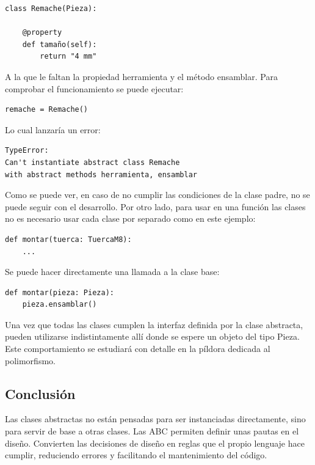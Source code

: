 \documentclass[11pt,a5paper,twoside]{book}
\begin{document}
\newpage


\begin{tcolorbox}
\scriptsize
 \begin{verbatim}
class Remache(Pieza):

    @property
    def tamaño(self):
        return "4 mm"
\end{verbatim}
\end{tcolorbox}
A la que le faltan la propiedad herramienta y el método ensamblar. Para comprobar el funcionamiento se puede ejecutar:


\begin{tcolorbox}
\scriptsize
 \begin{verbatim}
remache = Remache()
\end{verbatim}
\end{tcolorbox}
Lo cual lanzaría un error:


\begin{tcolorbox}
\scriptsize
 \begin{verbatim}
TypeError:
Can't instantiate abstract class Remache
with abstract methods herramienta, ensamblar
\end{verbatim}
\end{tcolorbox}
Como se puede ver, en caso de no cumplir las condiciones de la clase padre, no se puede seguir con el desarrollo.
Por otro lado, para usar en una función las clases no es necesario usar cada clase por separado como en este ejemplo:


\begin{tcolorbox}
\scriptsize
 \begin{verbatim}
def montar(tuerca: TuercaM8):
    ...
\end{verbatim}
\end{tcolorbox}
Se puede hacer directamente una llamada a la clase base:


\begin{tcolorbox}
\scriptsize
 \begin{verbatim}
def montar(pieza: Pieza):
    pieza.ensamblar()
\end{verbatim}
\end{tcolorbox}
Una vez que todas las clases cumplen la interfaz definida por la clase abstracta, pueden utilizarse indistintamente allí donde se espere un objeto del tipo Pieza. Este comportamiento se estudiará con detalle en la píldora dedicada al polimorfismo.
\subsection{Conclusión}
Las clases abstractas no están pensadas para ser instanciadas directamente, sino para servir de base a otras clases.
Las ABC permiten definir unas pautas en el diseño. Convierten las decisiones de diseño en reglas que el propio lenguaje hace cumplir, reduciendo errores y facilitando el mantenimiento del código.
\end{document}
